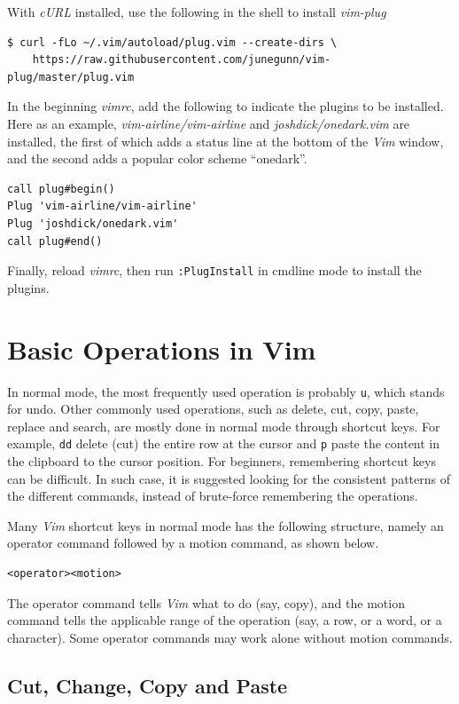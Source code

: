 With \textit{cURL} installed, use the following in the shell to install \textit{vim-plug}
\begin{lstlisting}
$ curl -fLo ~/.vim/autoload/plug.vim --create-dirs \
    https://raw.githubusercontent.com/junegunn/vim-plug/master/plug.vim
\end{lstlisting}

In the beginning \textit{vimrc}, add the following to indicate the plugins to be installed. Here as an example, \textit{vim-airline/vim-airline} and \textit{joshdick/onedark.vim} are installed, the first of which adds a status line at the bottom of the \textit{Vim} window, and the second adds a popular color scheme ``onedark''.
\begin{lstlisting}
call plug#begin()
Plug 'vim-airline/vim-airline'
Plug 'joshdick/onedark.vim'
call plug#end()
\end{lstlisting}

Finally, reload \textit{vimrc}, then run \verb|:PlugInstall| in cmdline mode to install the plugins.

\section{Basic Operations in Vim}

In normal mode, the most frequently used operation is probably \verb|u|, which stands for undo. Other commonly used operations, such as delete, cut, copy, paste, replace and search, are mostly done in normal mode through shortcut keys. For example, \verb|dd| delete (cut) the entire row at the cursor and \verb|p| paste the content in the clipboard to the cursor position. For beginners, remembering shortcut keys can be difficult. In such case, it is suggested looking for the consistent patterns of the different commands, instead of brute-force remembering the operations.

Many \textit{Vim} shortcut keys in normal mode has the following structure, namely an operator command followed by a motion command, as shown below.
\begin{lstlisting}
<operator><motion>
\end{lstlisting}
The operator command tells \textit{Vim} what to do (say, copy), and the motion command tells the applicable range of the operation (say, a row, or a word, or a character). Some operator commands may work alone without motion commands.

\subsection{Cut, Change, Copy and Paste}

